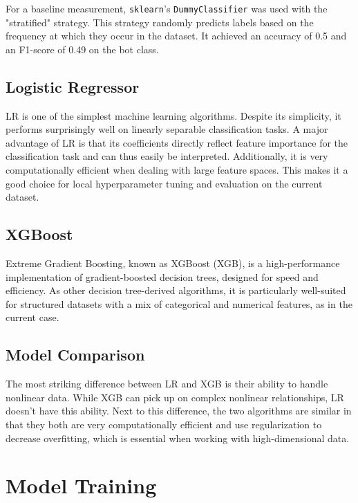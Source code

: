 \documentclass[twocolumn]{article}
\begin{document}
For a baseline measurement, \texttt{sklearn}'s \texttt{DummyClassifier} was used with the "stratified" strategy. This strategy randomly predicts labels based on the frequency at which they occur in the dataset. It achieved an accuracy of 0.5 and an F1-score of 0.49 on the bot class.

\subsection{Logistic Regressor}

LR is one of the simplest machine learning algorithms. Despite its simplicity, it performs surprisingly well on linearly separable classification tasks. A major advantage of LR is that its coefficients directly reflect feature importance for the classification task and can thus easily be interpreted. Additionally, it is very computationally efficient when dealing with large feature spaces. This makes it a good choice for local hyperparameter tuning and evaluation on the current dataset.

\subsection{XGBoost}

Extreme Gradient Boosting, known as XGBoost (XGB), is a high-performance implementation of gradient-boosted decision trees, designed for speed and efficiency. \parencite{chenXGBoostScalableTree2016} As other decision tree-derived algorithms, it is particularly well-suited for structured datasets with a mix of categorical and numerical features, as in the current case.

\subsection{Model Comparison}

The most striking difference between LR and XGB is their ability to handle nonlinear data. While XGB can pick up on complex nonlinear relationships, LR doesn't have this ability. 
Next to this difference, the two algorithms are similar in that they both are very computationally efficient and use regularization to decrease overfitting, which is essential when working with high-dimensional data.

\section{Model Training}
\end{document}
